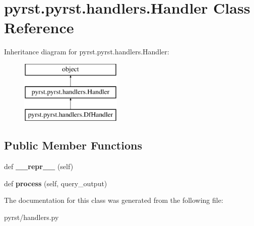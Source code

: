 \hypertarget{classpyrst_1_1pyrst_1_1handlers_1_1_handler}{}\section{pyrst.\+pyrst.\+handlers.\+Handler Class Reference}
\label{classpyrst_1_1pyrst_1_1handlers_1_1_handler}
Inheritance diagram for pyrst.\+pyrst.\+handlers.\+Handler\+:\begin{figure}[H]
\begin{center}
\leavevmode
\includegraphics[height=3.000000cm]{classpyrst_1_1pyrst_1_1handlers_1_1_handler}
\end{center}
\end{figure}
\subsection*{Public Member Functions}
\begin{DoxyCompactItemize}
\item 
\hypertarget{classpyrst_1_1pyrst_1_1handlers_1_1_handler_a15f25cdd5267f1bc9aef3669863b5c8e}{}def {\bfseries \+\_\+\+\_\+repr\+\_\+\+\_\+} (self)\label{classpyrst_1_1pyrst_1_1handlers_1_1_handler_a15f25cdd5267f1bc9aef3669863b5c8e}

\item 
\hypertarget{classpyrst_1_1pyrst_1_1handlers_1_1_handler_acbe028926c19f7228c02ef405e27825b}{}def {\bfseries process} (self, query\+\_\+output)\label{classpyrst_1_1pyrst_1_1handlers_1_1_handler_acbe028926c19f7228c02ef405e27825b}

\end{DoxyCompactItemize}


The documentation for this class was generated from the following file\+:\begin{DoxyCompactItemize}
\item 
pyrst/handlers.\+py\end{DoxyCompactItemize}
